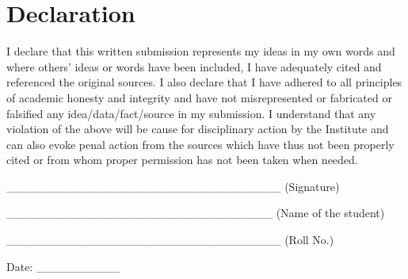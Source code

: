 \section*{Declaration}

I declare that this written submission represents my 
ideas in my own words and where others' ideas or words 
have been included, I have adequately cited and referenced the original
sources.  I also declare that I have adhered to all principles 
of academic honesty and integrity
and have not misrepresented or fabricated or falsified any 
idea/data/fact/source in my submission.
I understand that any violation of the above will be cause for 
disciplinary action by the Institute and can also evoke 
penal action from the sources which have thus not been
properly cited or from whom proper permission has not been taken when needed.



\_\_\_\_\_\_\_\_\_\_\_\_\_\_\_\_\_\_\_\_\_\_\_\_\_\_\_\_\_\_\_\_\_
(Signature)


\_\_\_\_\_\_\_\_\_\_\_\_\_\_\_\_\_\_\_\_\_\_\_\_\_\_\_\_\_\_\_\_
(Name of the student)


\_\_\_\_\_\_\_\_\_\_\_\_\_\_\_\_\_\_\_\_\_\_\_\_\_\_\_\_\_\_\_\_\_
(Roll No.)

Date: \_\_\_\_\_\_\_\_\_\_
